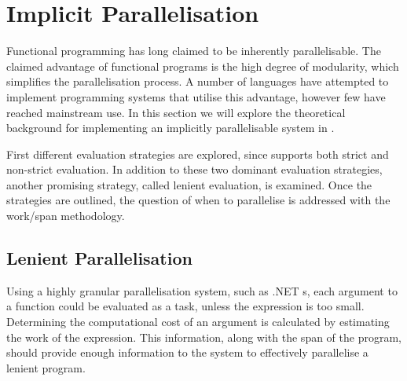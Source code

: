 \section{Implicit Parallelisation}\label{sec:implicit-para}
Functional programming has long claimed to be inherently parallelisable\cite{hudak1986functional, loidl1998granularity}. The claimed advantage of functional programs is the high degree of modularity, which simplifies the parallelisation process. A number of languages have attempted to implement programming systems that utilise this advantage, however few have reached mainstream use. In this section we will explore the theoretical background for implementing an implicitly parallelisable system in \fs.

First different evaluation strategies are explored, since \fs supports both strict and non-strict evaluation. In addition to these two dominant evaluation strategies, another promising strategy, called lenient evaluation, is examined. Once the strategies are outlined, the question of when to parallelise is addressed with the work/span methodology.




\subsection{Lenient Parallelisation}
Using a highly granular parallelisation system, such as .NET s, each argument to a function could be evaluated as a task, unless the expression is too small. Determining the computational cost of an argument is calculated by estimating the work of the expression. This information, along with the span of the program, should provide enough information to the system to effectively parallelise a lenient program.
